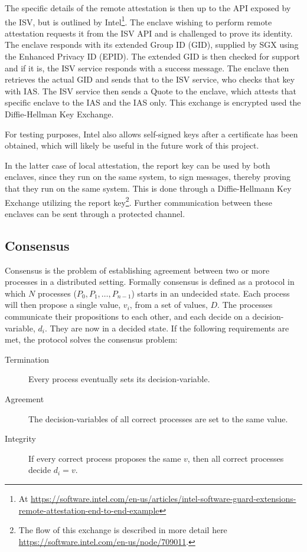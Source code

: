 \documentclass[12pt]{article}
\begin{document}
			The specific details of the remote attestation is then up to the API exposed by the ISV, but is outlined by Intel\footnote{At \url{https://software.intel.com/en-us/articles/intel-software-guard-extensions-remote-attestation-end-to-end-example}}.
			The enclave wishing to perform remote attestation requests it from the ISV API and is challenged to prove its identity.
			The enclave responds with its extended Group ID (GID), supplied by SGX using the Enhanced Privacy ID (EPID).
			The extended GID is then checked for support and if it is, the ISV service responds with a success message.
			The enclave then retrieves the actual GID and sends that to the ISV service, who checks that key with IAS.
			The ISV service then sends a Quote to the enclave, which attests that specific enclave to the IAS and the IAS only.
			This exchange is encrypted used the Diffie-Hellman Key Exchange. 

			For testing purposes, Intel also allows self-signed keys after a certificate has been obtained, which will likely be useful in the future work of this project.

			In the latter case of local attestation, the report key can be used by both enclaves, since they run on the same system, to sign messages, thereby proving that they run on the same system.
			This is done through a Diffie-Hellmann Key Exchange utilizing the report key\footnote{The flow of this exchange is described in more detail here \url{https://software.intel.com/en-us/node/709011}.}.
			Further communication between these enclaves can be sent through a protected channel.

		\subsection{Consensus}
		Consensus is the problem of establishing agreement between two or more processes in a distributed setting. Formally consensus is defined as a protocol in which $N$ processes ($P_0, P_1, \dots, P_{n-1}$) starts in an undecided state. Each process will then propose a single value, $v_i$, from a set of values, $D$. The processes communicate their propositions to each other, and each decide on a decision-variable, $d_i$. They are now in a decided state. If the following requirements are met, the protocol solves the consensus problem:
		\begin{description}
			\item[Termination] Every process eventually sets its decision-variable. 
			\item[Agreement] The decision-variables of all correct processes are set to the same value.
			\item[Integrity] If every correct process proposes the same $v$, then all correct processes decide $d_i = v$.
		\end{description}
\end{document}
